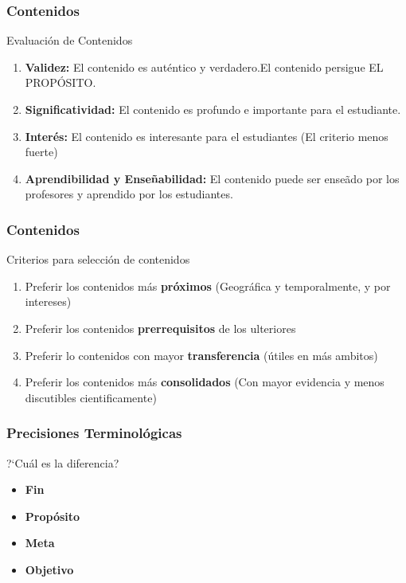 \documentclass{beamer}
\begin{document}
\begin{frame}
\frametitle{Contenidos}
\begin{block}{Evaluaci\'on de Contenidos} 
\begin{enumerate}
\item \textbf{Validez:} El contenido es aut\'entico y verdadero.El contenido persigue  EL PROP\'OSITO.  
\item\textbf{Significatividad:} El contenido es profundo e importante para el estudiante.
\item \textbf{Inter\'es:} El contenido es interesante para el estudiantes (El criterio menos fuerte) 
\item \textbf{Aprendibilidad y Ense\~nabilidad: }El contenido puede ser ense\~ado por los profesores y aprendido por los estudiantes.
\end{enumerate}
\end{block}
\end{frame}

\begin{frame}
\frametitle{Contenidos}
\begin{block}{Criterios para selecci\'on de contenidos} 
\begin{enumerate}
\item Preferir los contenidos m\'as \textbf{pr\'oximos}  (Geogr\'afica y temporalmente, y por intereses)
\item Preferir los contenidos \textbf{prerrequisitos} de los ulteriores
\item Preferir lo contenidos con mayor \textbf{transferencia} (\'utiles en m\'as ambitos)
\item Preferir los contenidos m\'as \textbf{consolidados} (Con mayor evidencia y menos discutibles cientificamente)
\end{enumerate}
\end{block}
\end{frame}

\begin{frame}

\frametitle{Precisiones Terminol\'ogicas}
\begin{block}
{?`Cu\'al es la diferencia?}
\begin{itemize}
\item \textbf{Fin}
\item \textbf{Prop\'osito} 
\item \textbf{Meta} 
\item \textbf{Objetivo}
\end{itemize}
\end{block}
\end{frame}
\end{document}
